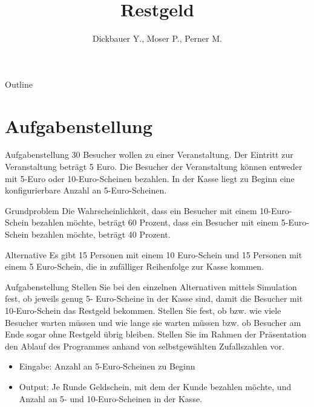 

\title[BSP18 - Restgeld]{Restgeld}
\author{Dickbauer Y., Moser P., Perner M.}



\begin{frame}
  \titlepage
\end{frame}

\begin{frame}{Outline}
  \tableofcontents
\end{frame}

\section{Aufgabenstellung}
\begin{frame}{Aufgabenstellung}
30 Besucher wollen zu einer Veranstaltung. Der Eintritt zur Veranstaltung beträgt 5
Euro. Die Besucher der Veranstaltung können entweder mit 5-Euro oder 10-Euro-Scheinen
bezahlen. In der Kasse liegt zu Beginn eine konfigurierbare Anzahl an 5-Euro-Scheinen.

\begin{block}{Grundproblem}
Die Wahrscheinlichkeit, dass ein Besucher mit einem 10-Euro-Schein bezahlen
möchte, beträgt 60 Prozent, dass ein Besucher mit einem 5-Euro-Schein bezahlen
möchte, beträgt 40 Prozent.   
\end{block}

\begin{block}{Alternative}
Es gibt 15 Personen mit einem 10 Euro-Schein und 15 Personen mit einem
5 Euro-Schein, die in zufälliger Reihenfolge zur Kasse kommen.
\end{block}
\end{frame}


\begin{frame}{Aufgabenstellung}
Stellen Sie bei den einzelnen Alternativen mittels Simulation fest, ob jeweils genug 5-
Euro-Scheine in der Kasse sind, damit die Besucher mit 10-Euro-Schein das Restgeld
bekommen. Stellen Sie fest, ob bzw. wie viele Besucher warten müssen und wie lange sie
warten müssen bzw. ob Besucher am Ende sogar ohne Restgeld übrig bleiben. Stellen Sie
im Rahmen der Präsentation den Ablauf des Programmes anhand von selbstgewählten
Zufallszahlen vor.

\begin{itemize}
  \item Eingabe: Anzahl an 5-Euro-Scheinen zu Beginn
  \item Output: Je Runde Geldschein, mit dem der Kunde bezahlen möchte, und Anzahl
an 5- und 10-Euro-Scheinen in der Kasse.
\end{itemize}
\end{frame}


